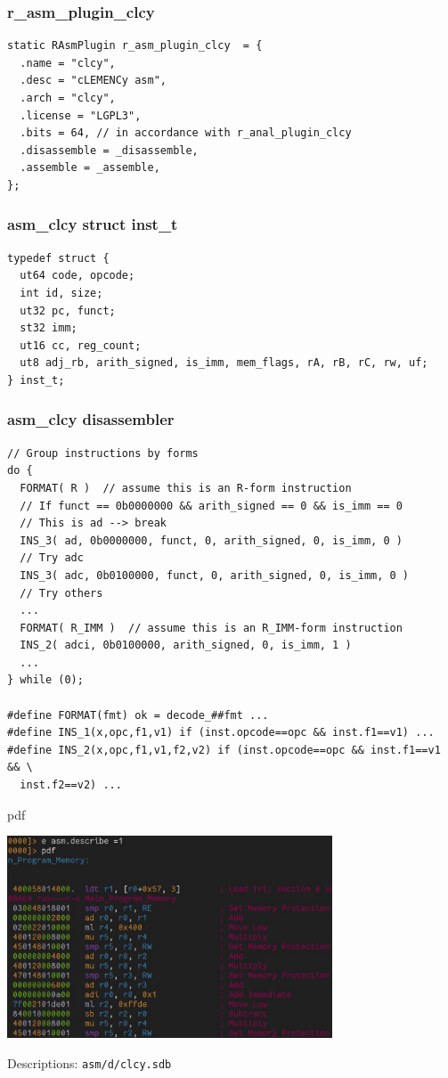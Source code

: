 \documentclass{beamer}
\begin{document}
\begin{frame}[fragile]
  \frametitle{r\_asm\_plugin\_clcy}
  \scriptsize
  \begin{verbatim}
static RAsmPlugin r_asm_plugin_clcy  = {
  .name = "clcy",
  .desc = "cLEMENCy asm",
  .arch = "clcy",
  .license = "LGPL3",
  .bits = 64, // in accordance with r_anal_plugin_clcy
  .disassemble = _disassemble,
  .assemble = _assemble,
};
  \end{verbatim}
\end{frame}

\begin{frame}[fragile]
  \frametitle{asm\_clcy struct inst\_t}
  \scriptsize
  \begin{verbatim}
typedef struct {
  ut64 code, opcode;
  int id, size;
  ut32 pc, funct;
  st32 imm;
  ut16 cc, reg_count;
  ut8 adj_rb, arith_signed, is_imm, mem_flags, rA, rB, rC, rw, uf;
} inst_t;
  \end{verbatim}
\end{frame}

\begin{frame}[fragile]
  \frametitle{asm\_clcy disassembler}
  \scriptsize
  \begin{verbatim}
// Group instructions by forms
do {
  FORMAT( R )  // assume this is an R-form instruction
  // If funct == 0b0000000 && arith_signed == 0 && is_imm == 0
  // This is ad --> break
  INS_3( ad, 0b0000000, funct, 0, arith_signed, 0, is_imm, 0 )
  // Try adc
  INS_3( adc, 0b0100000, funct, 0, arith_signed, 0, is_imm, 0 )
  // Try others
  ...
  FORMAT( R_IMM )  // assume this is an R_IMM-form instruction
  INS_2( adci, 0b0100000, arith_signed, 0, is_imm, 1 )
  ...
} while (0);

#define FORMAT(fmt) ok = decode_##fmt ...
#define INS_1(x,opc,f1,v1) if (inst.opcode==opc && inst.f1==v1) ...
#define INS_2(x,opc,f1,v1,f2,v2) if (inst.opcode==opc && inst.f1==v1 && \
  inst.f2==v2) ...
  \end{verbatim}
\end{frame}

\begin{frame}{pdf}
  \begin{center}
    \includegraphics[height=6cm]{pdf.jpg}
  \end{center}
  \begin{center}
    Descriptions: \texttt{asm/d/clcy.sdb}
  \end{center}
\end{frame}
\end{document}
